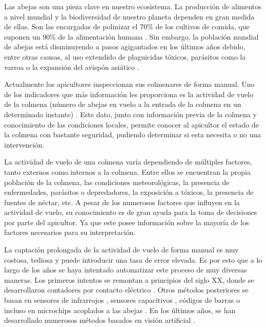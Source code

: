 
Las abejas son una pieza clave en nuestro ecosistema. La producción de
alimentos a nivel mundial y la biodiversidad de nuestro planeta dependen
en gran medida de ellas. Son las encargadas de polinizar el 70\% de los
cultivos de comida, que suponen un 90\% de la alimentación humana \citep{art:bees_decline}. 
Sin embargo, la población mundial de abejas
está disminuyendo a pasos agigantados en los últimos años debido, entre
otras causas, al uso extendido de plaguicidas tóxicos, parásitos como la
varroa o la expansión del avispón asiático \citep{art:ccd}.

Actualmente los apicultores inspeccionan sus colmenares de forma manual.
Uno de los indicadores que más información les proporciona es la
actividad de vuelo de la colmena (número de abejas en vuelo a la entrada
de la colmena en un determinado instante) \citep{art:campbell2008}. Este
dato, junto con información previa de la colmena y conocimiento de las
condiciones locales, permite conocer al apicultor el estado de la
colmena con bastante seguridad, pudiendo determinar si esta necesita o
no una intervención.

La actividad de vuelo de una colmena varía dependiendo de múltiples
factores, tanto externos como internos a la colmena. Entre ellos se
encuentran la propia población de la colmena, las condiciones
meteorológicas, la presencia de enfermedades, parásitos o depredadores,
la exposición a tóxicos, la presencia de fuentes de néctar, etc. A pesar
de los numerosos factores que influyen en la actividad de vuelo, su
conocimiento es de gran ayuda para la toma de decisiones por parte del
apicultor. Ya que este posee información sobre la mayoría de los
factores necesarios para su interpretación.

La captación prolongada de la actividad de vuelo de forma manual es muy
costosa, tediosa y puede introducir una tasa de error elevada. Es por
esto que a lo largo de los años se haya intentado automatizar este
proceso de muy diversas maneras. Los primeros intentos se remontan a
principios del siglo XX, donde se desarrollaron contadores por contacto
eléctrico \citep{art:lundie1925}. Otros métodos posteriores se basan en
sensores de infrarrojos \citep{art:struye1994}, sensores capacitivos
\citep{art:campbell2005}, códigos de barras \citep{beebarcode} o incluso
en microchips acoplados a las abejas
\citep{art:decourtye_honeybee_2011}. En los últimos años, se han
desarrollado numerosos métodos basados en visión artificial
\citep{art:campbell2008,art:chiron2013a,art:chiron2013,art:tashakkori2015}.

